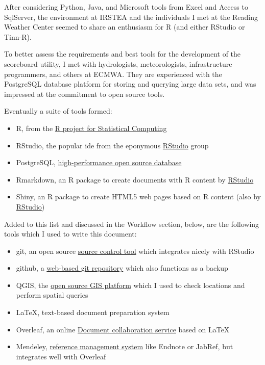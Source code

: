 \documentclass[logos,parttoc,morelanguage=french,morelanguage=german,draft]{orsay-memoire}
\begin{document}
After considering Python, Java, and Microsoft tools from Excel and Access to SqlServer, the environment at IRSTEA and the individuals I met at the Reading Weather Center seemed to share an enthusiasm for R (and either RStudio or Tinn-R).

To better assess the requirements and best tools for the development of the scoreboard utility, I met with hydrologists, meteorologists, infrastructure programmers, and others at ECMWA. They are experienced with the PostgreSQL database platform for storing and querying large data sets, and was impressed at the commitment to open source tools.

Eventually a suite of tools formed:

\begin{itemize}
\item R, from the \href{https://www.r-project.org/}{R project for Statistical Computing}
\item RStudio, the popular \gls{ide} from the eponymous \href{https://www.rstudio.com/}{RStudio} group
\item PostgreSQL, \href{https://www.postgresql.org/}{high-performance open source database}
\item Rmarkdown, an R package to create documents with R content by \href{https://www.rstudio.com/}{RStudio}
\item Shiny, an R package to create HTML5 web pages based on R content (also by \href{https://www.rstudio.com/}{RStudio})
\end{itemize}

Added to this list and discussed in the Workflow section, below, are the following tools which I used to write this document:

\begin{itemize}
\item git, an open source \href{https://git-scm.com/}{source control tool} which integrates nicely with RStudio
\item github, a \href{https://github.com/}{web-based git repository} which also functions as a backup
\item QGIS, the \href{http://www.qgis.org/fr/site/}{open source GIS platform} which I used to check locations and perform spatial queries
\item \gls{LaTeX}, text-based document preparation system
\item Overleaf, an online \href{https://www.overleaf.com/}{Document collaboration service} based on LaTeX
\item Mendeley, \href{https://www.mendeley.com/}{reference management system} like Endnote or JabRef, but integrates well with Overleaf
\end{itemize}
\end{document}
